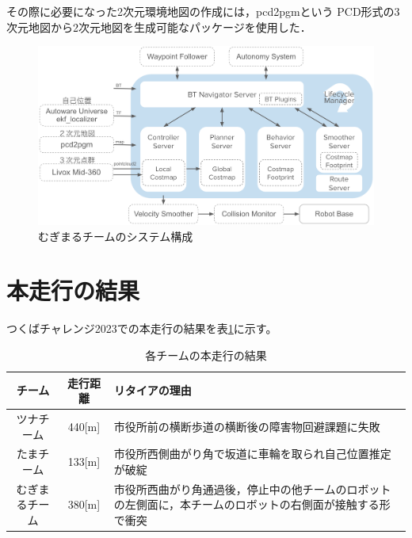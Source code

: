 \documentclass[twocolumn,9pt]{jsproceedings}
\begin{document}
その際に必要になった2次元環境地図の作成には，pcd2pgmという
PCD形式の3次元地図から2次元地図を生成可能なパッケージを使用した．

\begin{figure}[h]
  \begin{center}
    \includegraphics[width=1.0\linewidth]{figs/mugimaru_system.pdf}
    \caption{むぎまるチームのシステム構成}
    \label{fig:mugimaru_system}
  \end{center}
\end{figure}



\section{本走行の結果}

つくばチャレンジ2023での本走行の結果を表\ref{MainRun}に示す。

\begin{table}[H]
  \caption{各チームの本走行の結果}
  \label{MainRun}
  \begin{tabular}{|c|c|p{4.0cm}|}
    \hline
    チーム         & 走行距離 & リタイアの理由                                                                                             \\
    \hline
    ツナチーム     & 440[m]   & 市役所前の横断歩道の横断後の障害物回避課題に失敗                                                           \\
    \hline
    たまチーム     & 133[m]   & 市役所西側曲がり角で坂道に車輪を取られ自己位置推定が破綻                                                   \\
    \hline
    むぎまるチーム & 380[m]    & 市役所西曲がり角通過後，停止中の他チームのロボットの左側面に，本チームのロボットの右側面が接触する形で衝突 \\
    \hline
  \end{tabular}
\end{table}
\end{document}
